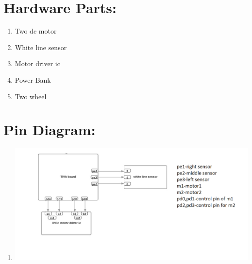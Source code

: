 \documentclass[a4paper,12pt,oneside]{book}
\begin{document}
\section{Hardware Parts:}
\begin{enumerate}
\item Two dc motor
\item White line sensor
\item Motor driver ic
\item Power Bank
\item Two wheel
\end{enumerate}

\section{Pin Diagram:}
\begin{enumerate}
\item

\includegraphics[width=400 px]{pin.png}

\end{enumerate}
\end{document}
